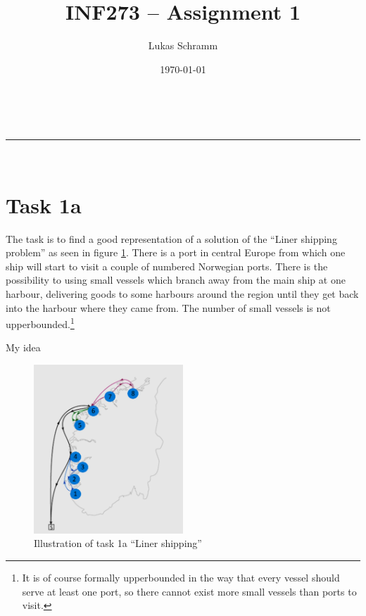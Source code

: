 \documentclass[a4paper,11pt]{article}
\makeatletter
\newcommand{\linia}{\rule{\linewidth}{0.5pt}}
\theoremstyle{mytheor}
\renewcommand{\maketitle}{
\begin{center}
\vspace{2ex}
{\huge \textsc{\@title}}
\vspace{1ex}
\\
\linia\\
\@author \hfill \@date
\vspace{4ex}
\end{center}
}
\makeatother
\begin{document}
\title{INF273 – Assignment 1}

\author{Lukas Schramm}

\date{\today}

\maketitle

\section*{Task 1a}
The task is to find a good representation of a solution of the \enquote{Liner shipping problem} as seen in figure \ref{fig:task1a}. There is a port in central Europe from which one ship will start to visit a couple of numbered Norwegian ports. There is the possibility to using small vessels which branch away from the main ship at one harbour, delivering goods to some harbours around the region until they get back into the harbour where they came from. The number of small vessels is not upperbounded.\footnote{It is of course formally upperbounded in the way that every vessel should serve at least one port, so there cannot exist more small vessels than ports to visit.}\medskip

My idea

\begin{figure}[h]
\centering
\includegraphics[width=0.5\textwidth]{task1a}
\caption{Illustration of task 1a \enquote{Liner shipping}}
\label{fig:task1a}
\end{figure}

\clearpage
\end{document}
